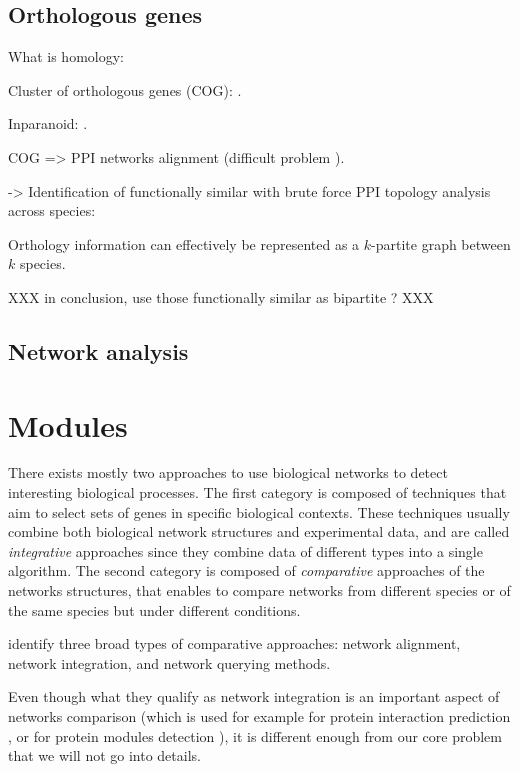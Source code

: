 	\subsection{Orthologous genes}
	\label{subsec:orthology}

	What is homology: \parencite{mccune2012using}

	Cluster of orthologous genes (COG): \parencite{tatusov1997genomic}.
	
	Inparanoid: \parencite{obrien2005inparanoid}.

	COG => PPI networks alignment (difficult problem \parencite{el2011lagrangian}).

	-> Identification of functionally similar with brute force PPI topology analysis across species: \parencite{bandyopadhyay2006systematic}


	Orthology information can effectively be represented as a $k$-partite graph between $k$ species.

	XXX in conclusion, use those functionally similar as bipartite ? XXX

	\subsection{Network analysis}


\section{Modules}

There exists mostly two approaches to use biological networks to detect interesting biological processes.
The first category is composed of techniques that aim to select sets of genes in specific biological contexts.
These techniques usually combine both biological network structures and experimental data, and are called \emph{integrative} approaches since they combine data of different types into a single algorithm.
The second category is composed of \emph{comparative} approaches of the networks structures, that enables to compare networks from different species or of the same species but under different conditions.

	\Textcite{sharan2006modeling} identify three broad types of comparative approaches: network alignment, network integration, and network querying methods.

	Even though what they qualify as network integration is an important aspect of networks comparison (which is used for example for protein interaction prediction \parencite{rhodes2005probabilistic}, or for protein modules detection \parencites{kelley2005systematic}{zhang2005biology}), it is different enough from our core problem that we will not go into details.

